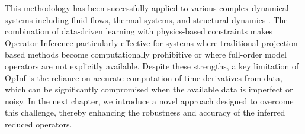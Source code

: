 This methodology has been successfully applied to various complex dynamical systems including fluid flows, thermal systems, and structural dynamics \cite{ghattas2021learning,rowley2017model}. The combination of data-driven learning with physics-based constraints makes Operator Inference particularly effective for systems where traditional projection-based methods become computationally prohibitive or where full-order model operators are not explicitly available. Despite these strengths, a key limitation of OpInf is the reliance on accurate computation of time derivatives from data, which can be significantly compromised when the available data is imperfect or noisy. In the next chapter, we introduce a novel approach designed to overcome this challenge, thereby enhancing the robustness and accuracy of the inferred reduced operators.

